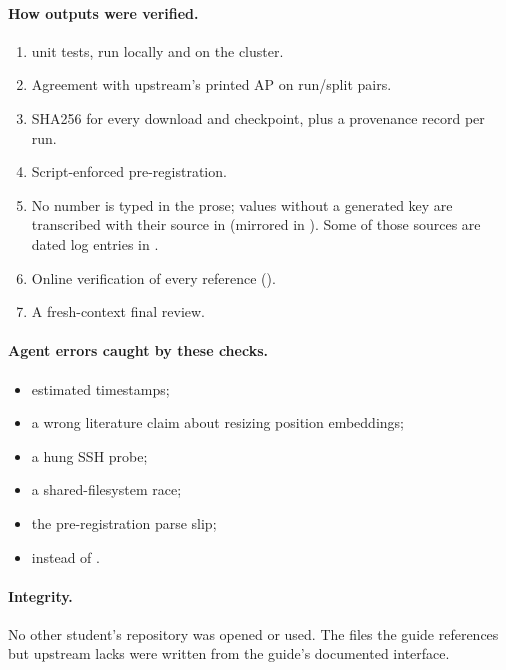 \paragraph{How outputs were verified.}
\begin{enumerate}[label=(\arabic*), leftmargin=*]
  \item {} unit tests, run locally and on the cluster.
  \item Agreement with upstream's printed AP on  run/split pairs.
  \item SHA256 for every download and checkpoint, plus a  provenance record per run.
  \item Script-enforced pre-registration.
  \item No number is typed in the prose; values without a generated key are transcribed with their source in  (mirrored in ). Some of those sources are dated log entries in .
  \item Online verification of every reference ().
  \item A fresh-context final review.
\end{enumerate}

\paragraph{Agent errors caught by these checks.}
\begin{itemize}[leftmargin=*]
  \item estimated timestamps;
  \item a wrong literature claim about resizing position embeddings;
  \item a hung SSH probe;
  \item a shared-filesystem race;
  \item the pre-registration parse slip;
  \item {} instead of .
\end{itemize}

\paragraph{Integrity.} No other student's repository was opened or used. The files the guide references but upstream lacks were written from the guide's documented interface.
